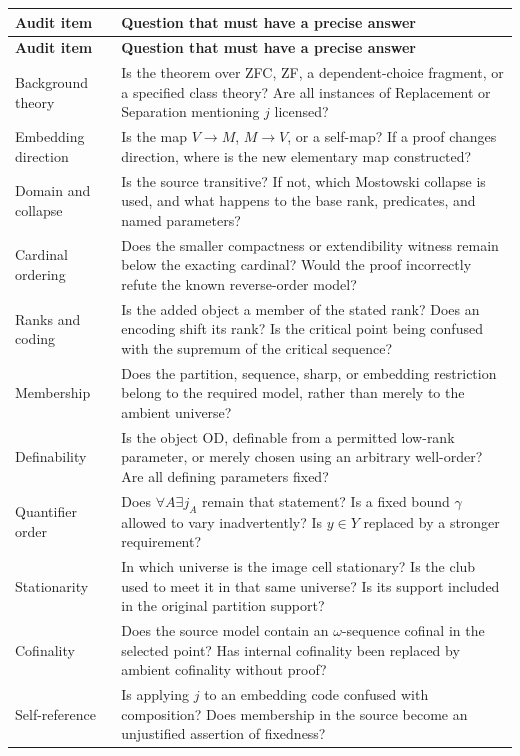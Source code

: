 \documentclass[11pt,letterpaper]{article}
\theoremstyle{definition}
\begin{document}
\begingroup\small
\renewcommand{\arraystretch}{1.16}
\begin{longtable}{@{}P{.24\textwidth}P{.69\textwidth}@{}}
\toprule
\textbf{Audit item}&\textbf{Question that must have a precise answer}\\\midrule\endfirsthead
\toprule\textbf{Audit item}&\textbf{Question that must have a precise answer}\\\midrule\endhead
Background theory & Is the theorem over ZFC, ZF, a dependent-choice fragment, or a specified class theory? Are all instances of Replacement or Separation mentioning $j$ licensed?\\[4pt]
Embedding direction & Is the map $V\to M$, $M\to V$, or a self-map? If a proof changes direction, where is the new elementary map constructed?\\[4pt]
Domain and collapse & Is the source transitive? If not, which Mostowski collapse is used, and what happens to the base rank, predicates, and named parameters?\\[4pt]
Cardinal ordering & Does the smaller compactness or extendibility witness remain below the exacting cardinal? Would the proof incorrectly refute the known reverse-order model?\\[4pt]
Ranks and coding & Is the added object a member of the stated rank? Does an encoding shift its rank? Is the critical point being confused with the supremum of the critical sequence?\\[4pt]
Membership & Does the partition, sequence, sharp, or embedding restriction belong to the required model, rather than merely to the ambient universe?\\[4pt]
Definability & Is the object OD, definable from a permitted low-rank parameter, or merely chosen using an arbitrary well-order? Are all defining parameters fixed?\\[4pt]
Quantifier order & Does $\forall A\exists j_A$ remain that statement? Is a fixed bound $\gamma$ allowed to vary inadvertently? Is $y\in Y$ replaced by a stronger requirement?\\[4pt]
Stationarity & In which universe is the image cell stationary? Is the club used to meet it in that same universe? Is its support included in the original partition support?\\[4pt]
Cofinality & Does the source model contain an $\omega$-sequence cofinal in the selected point? Has internal cofinality been replaced by ambient cofinality without proof?\\[4pt]
Self-reference & Is applying $j$ to an embedding code confused with composition? Does membership in the source become an unjustified assertion of fixedness?\\[4pt]

\end{longtable}
\end{document}

